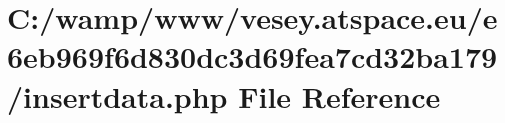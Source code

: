 \hypertarget{e6eb969f6d830dc3d69fea7cd32ba179_2insertdata_8php}{\section{C\-:/wamp/www/vesey.atspace.\-eu/e6eb969f6d830dc3d69fea7cd32ba179/insertdata.php File Reference}
\label{e6eb969f6d830dc3d69fea7cd32ba179_2insertdata_8php}
}
